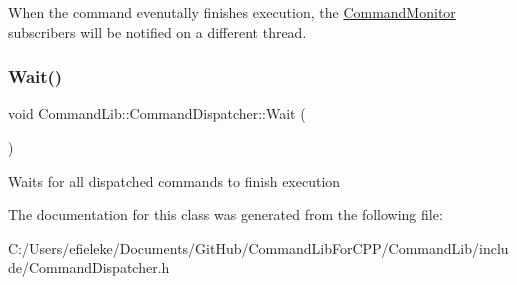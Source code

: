 When the command evenutally finishes execution, the \mbox{\hyperlink{class_command_lib_1_1_command_monitor}{Command\+Monitor}} subscribers will be notified on a different thread. \mbox{\label{class_command_lib_1_1_command_dispatcher_ad5f8cae272c637ac628977c1556171c6}} 
\subsubsection{\texorpdfstring{Wait()}{Wait()}}
{\footnotesize\ttfamily void Command\+Lib\+::\+Command\+Dispatcher\+::\+Wait (\begin{DoxyParamCaption}{ }\end{DoxyParamCaption})}



Waits for all dispatched commands to finish execution 



The documentation for this class was generated from the following file\+:\begin{DoxyCompactItemize}
\item 
C\+:/\+Users/efieleke/\+Documents/\+Git\+Hub/\+Command\+Lib\+For\+C\+P\+P/\+Command\+Lib/include/Command\+Dispatcher.\+h\end{DoxyCompactItemize}
